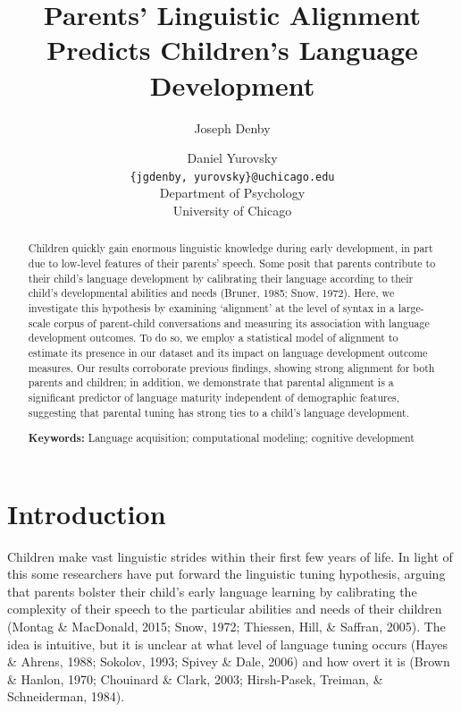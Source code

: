 \documentclass[10pt, letterpaper]{article}
\title{Parents' Linguistic Alignment Predicts Children's Language Development}
\author{Joseph Denby \and Daniel Yurovsky \\
        \texttt{\{jgdenby, yurovsky\}@uchicago.edu} \\
       Department of Psychology \\ University of Chicago}
\begin{document}
\maketitle

\begin{abstract}
Children quickly gain enormous linguistic knowledge during early
development, in part due to low-level features of their parents' speech.
Some posit that parents contribute to their child's language development
by calibrating their language according to their child's developmental
abilities and needs (Bruner, 1985; Snow, 1972). Here, we investigate
this hypothesis by examining `alignment' at the level of syntax in a
large-scale corpus of parent-child conversations and measuring its
association with language development outcomes. To do so, we employ a
statistical model of alignment to estimate its presence in our dataset
and its impact on language development outcome measures. Our results
corroborate previous findings, showing strong alignment for both parents
and children; in addition, we demonstrate that parental alignment is a
significant predictor of language maturity independent of demographic
features, suggesting that parental tuning has strong ties to a child's
language development.

\textbf{Keywords:}
Language acquisition; computational modeling; cognitive development
\end{abstract}

\hypertarget{introduction}{%
\section{Introduction}\label{introduction}}

Children make vast linguistic strides within their first few years of
life. In light of this some researchers have put forward the linguistic
tuning hypothesis, arguing that parents bolster their child's early
language learning by calibrating the complexity of their speech to the
particular abilities and needs of their children (Montag \& MacDonald,
2015; Snow, 1972; Thiessen, Hill, \& Saffran, 2005). The idea is
intuitive, but it is unclear at what level of language tuning occurs
(Hayes \& Ahrens, 1988; Sokolov, 1993; Spivey \& Dale, 2006) and how
overt it is (Brown \& Hanlon, 1970; Chouinard \& Clark, 2003;
Hirsh-Pasek, Treiman, \& Schneiderman, 1984).
\end{document}
